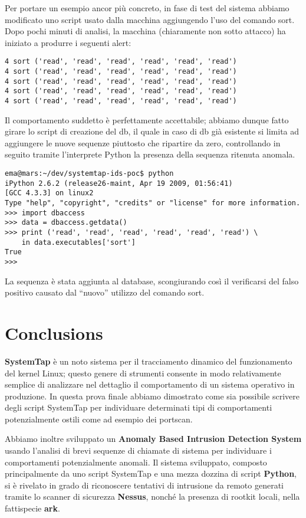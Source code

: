\documentclass[11pt]{article}
\begin{document}
Per portare un esempio ancor più concreto, in fase di test del sistema abbiamo
modificato uno script usato dalla macchina aggiungendo l'uso del comando sort.
Dopo pochi minuti di analisi, la macchina (chiaramente non sotto attacco) ha
iniziato a produrre i seguenti alert:

\begin{lstlisting}
4 sort ('read', 'read', 'read', 'read', 'read', 'read')
4 sort ('read', 'read', 'read', 'read', 'read', 'read')
4 sort ('read', 'read', 'read', 'read', 'read', 'read')
4 sort ('read', 'read', 'read', 'read', 'read', 'read')
4 sort ('read', 'read', 'read', 'read', 'read', 'read')
\end{lstlisting}

Il comportamento suddetto è perfettamente accettabile; abbiamo dunque fatto
girare lo script di creazione del db, il quale in caso di db già esistente si
limita ad aggiungere le nuove sequenze piuttosto che ripartire da zero,
controllando in seguito tramite l'interprete Python la presenza della sequenza
ritenuta anomala. 

\begin{lstlisting}
ema@mars:~/dev/systemtap-ids-poc$ python
iPython 2.6.2 (release26-maint, Apr 19 2009, 01:56:41) 
[GCC 4.3.3] on linux2
Type "help", "copyright", "credits" or "license" for more information.
>>> import dbaccess
>>> data = dbaccess.getdata()
>>> print ('read', 'read', 'read', 'read', 'read', 'read') \
    in data.executables['sort']
True
>>> 
\end{lstlisting}

La sequenza è stata aggiunta al database, scongiurando così il verificarsi del
falso positivo causato dal ``nuovo'' utilizzo del comando sort.

\section{Conclusions}
\textbf{SystemTap} è un noto sistema per il tracciamento dinamico del
funzionamento del kernel Linux; questo genere di strumenti consente in modo
relativamente semplice di analizzare nel dettaglio il comportamento di un
sistema operativo in produzione. In questa prova finale abbiamo dimostrato come
sia possibile scrivere degli script SystemTap per individuare determinati tipi
di comportamenti potenzialmente ostili come ad esempio dei portscan.

Abbiamo inoltre sviluppato un \textbf{Anomaly Based Intrusion Detection System}
usando l'analisi di brevi sequenze di chiamate di sistema per individuare i
comportamenti potenzialmente anomali. Il sistema sviluppato, composto
principalmente da uno script SystemTap e una mezza dozzina di script
\textbf{Python}, si è rivelato in grado di riconoscere tentativi di intrusione
da remoto generati tramite lo scanner di sicurezza \textbf{Nessus}, nonché la
presenza di rootkit locali, nella fattispecie \textbf{ark}.
\end{document}
